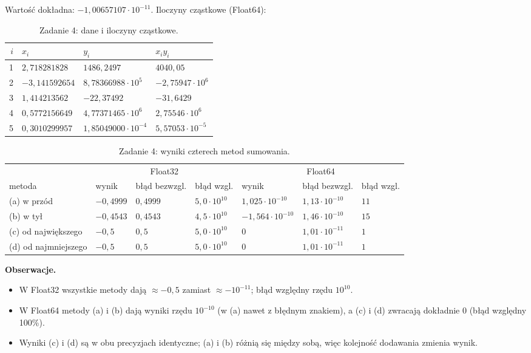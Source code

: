 \documentclass[11pt,a4paper]{article}
\begin{document}
Wartość dokładna: $-1{,}00657107\cdot10^{-11}$. Iloczyny cząstkowe (Float64):

\begin{table}[h]
\centering\small
\begin{tabular}{@{}rlll@{}}
\toprule
$i$ & $x_i$ & $y_i$ & $x_iy_i$ \\
\midrule
1 & $2{,}718281828$ & $1486{,}2497$ & $4040{,}05$ \\
2 & $-3{,}141592654$ & $8{,}78366988\cdot10^{5}$ & $-2{,}75947\cdot10^{6}$ \\
3 & $1{,}414213562$ & $-22{,}37492$ & $-31{,}6429$ \\
4 & $0{,}5772156649$ & $4{,}77371465\cdot10^{6}$ & $2{,}75546\cdot10^{6}$ \\
5 & $0{,}3010299957$ & $1{,}85049000\cdot10^{-4}$ & $5{,}57053\cdot10^{-5}$ \\
\bottomrule
\end{tabular}
\caption{Zadanie 4: dane i iloczyny cząstkowe.}
\end{table}

\begin{table}[h]
\centering\footnotesize\setlength{\tabcolsep}{4pt}
\begin{tabular}{@{}lllllll@{}}
\toprule
 & \multicolumn{3}{c}{Float32} & \multicolumn{3}{c}{Float64} \\
\cmidrule(lr){2-4}\cmidrule(lr){5-7}
metoda & wynik & błąd bezwzgl. & błąd wzgl. & wynik & błąd bezwzgl. & błąd wzgl. \\
\midrule
(a) w przód & $-0{,}4999$ & $0{,}4999$ & $5{,}0\cdot10^{10}$ & $1{,}025\cdot10^{-10}$ & $1{,}13\cdot10^{-10}$ & $11$ \\
(b) w tył & $-0{,}4543$ & $0{,}4543$ & $4{,}5\cdot10^{10}$ & $-1{,}564\cdot10^{-10}$ & $1{,}46\cdot10^{-10}$ & $15$ \\
(c) od największego & $-0{,}5$ & $0{,}5$ & $5{,}0\cdot10^{10}$ & $0$ & $1{,}01\cdot10^{-11}$ & $1$ \\
(d) od najmniejszego & $-0{,}5$ & $0{,}5$ & $5{,}0\cdot10^{10}$ & $0$ & $1{,}01\cdot10^{-11}$ & $1$ \\
\bottomrule
\end{tabular}
\caption{Zadanie 4: wyniki czterech metod sumowania.}
\end{table}

\textbf{Obserwacje.}
\begin{itemize}
\item W Float32 wszystkie metody dają $\approx-0{,}5$ zamiast $\approx-10^{-11}$; błąd względny rzędu $10^{10}$.
\item W Float64 metody (a) i (b) dają wyniki rzędu $10^{-10}$ (w (a) nawet z błędnym znakiem), a (c) i (d) zwracają dokładnie $0$ (błąd względny 100\%).
\item Wyniki (c) i (d) są w obu precyzjach identyczne; (a) i (b) różnią się między sobą, więc kolejność dodawania zmienia wynik.
\end{itemize}
\end{document}
